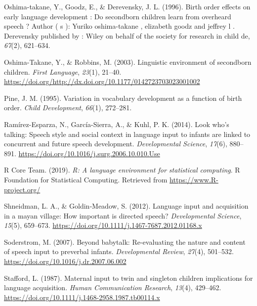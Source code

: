 \documentclass[man,floatsintext]{apa6}
\begin{document}
\leavevmode\hypertarget{ref-oshima-takane_birth_1996}{}%
Oshima-takane, Y., Goodz, E., \& Derevensky, J. L. (1996). Birth order effects on early language development : Do secondborn children learn from overheard speech ? Author ( s ): Yuriko oshima-takane , elizabeth goodz and jeffrey l . Derevensky published by : Wiley on behalf of the society for research in child de, \emph{67}(2), 621--634.

\leavevmode\hypertarget{ref-oshima-takane_linguistic_2003}{}%
Oshima-Takane, Y., \& Robbins, M. (2003). Linguistic environment of secondborn children. \emph{First Language}, \emph{23}(1), 21--40. \url{https://doi.org/http://dx.doi.org/10.1177/0142723703023001002}

\leavevmode\hypertarget{ref-pine_variation_1995}{}%
Pine, J. M. (1995). Variation in vocabulary development as a function of birth order. \emph{Child Development}, \emph{66}(1), 272--281.

\leavevmode\hypertarget{ref-ramirez-esparza_look_2014}{}%
Ramírez-Esparza, N., García-Sierra, A., \& Kuhl, P. K. (2014). Look who's talking: Speech style and social context in language input to infants are linked to concurrent and future speech development. \emph{Developmental Science}, \emph{17}(6), 880--891. \url{https://doi.org/10.1016/j.surg.2006.10.010.Use}

\leavevmode\hypertarget{ref-r_core_team_r_2019}{}%
R Core Team. (2019). \emph{R: A language environment for statistical computing}. R Foundation for Statistical Computing. Retrieved from \url{https://www.R-project.org/}

\leavevmode\hypertarget{ref-shneidman_language_2012}{}%
Shneidman, L. A., \& Goldin‐Meadow, S. (2012). Language input and acquisition in a mayan village: How important is directed speech? \emph{Developmental Science}, \emph{15}(5), 659--673. \url{https://doi.org/10.1111/j.1467-7687.2012.01168.x}

\leavevmode\hypertarget{ref-soderstrom_beyond_2007}{}%
Soderstrom, M. (2007). Beyond babytalk: Re-evaluating the nature and content of speech input to preverbal infants. \emph{Developmental Review}, \emph{27}(4), 501--532. \url{https://doi.org/10.1016/j.dr.2007.06.002}

\leavevmode\hypertarget{ref-stafford_maternal_1987}{}%
Stafford, L. (1987). Maternal input to twin and singleton children implications for language acquisition. \emph{Human Communication Research}, \emph{13}(4), 429--462. \url{https://doi.org/10.1111/j.1468-2958.1987.tb00114.x}
\end{document}
